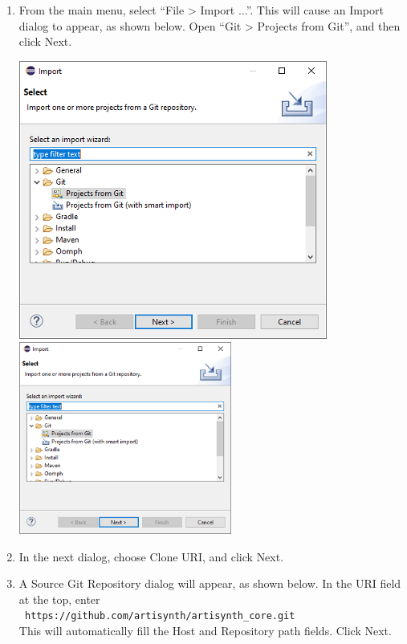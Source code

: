 \begin{enumerate}

\item From the main menu, select ``{\sf File > Import ...}''.  This will
cause an {\sf Import} dialog to appear, as shown
below.
Open ``{\sf Git > Projects from Git}'', and
then click {\sf Next}.

\begin{center}
\iflatexml
   \includegraphics[]{images/EclipseImport}
\else
   \includegraphics[width=0.55\textwidth]{images/EclipseImport}
\fi
\end{center}

\item In the next dialog, choose {\sf Clone URI}, and click {\sf Next}.

\item A {\sf Source Git Repository} dialog will appear, as shown
below.
In the {\sf URI} field at the top, enter\\{\tt
https://github.com/artisynth/artisynth\_core.git}\\This will
automatically fill the {\sf Host} and {\sf Repository path} fields.
Click {\sf Next}.


\end{enumerate}
